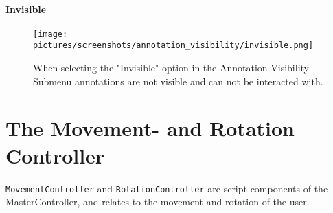 \paragraph{Invisible}
\begin{figure}%
	\texttt{[image: pictures/screenshots/annotation\_visibility/invisible.png]}
	\caption[Annotation invisible]{When selecting the "Invisible" option in the Annotation Visibility Submenu annotations are not visible and can not be interacted with.}
	\label{fig:invisible}
\end{figure} 

\section{The Movement- and Rotation Controller}
\texttt{MovementController} and \texttt{RotationController} are script components of the MasterController, and relates to the movement and rotation of the user.












